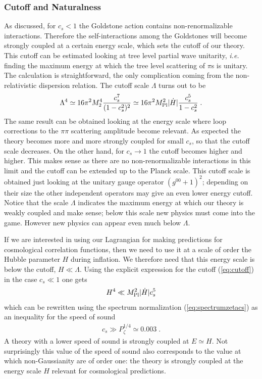 \documentclass[12pt,letterpaper]{article}
\def\be{\begin{eqnarray}}
\def\ee{\end{eqnarray}}
\begin{document}
{\subsubsection{Cutoff and Naturalness}
As discussed, for $c_s <1$ the Goldstone action contains
non-renormalizable interactions. Therefore the self-interactions among
the Goldstones will become strongly coupled at a certain energy scale, which
sets the cutoff of our theory. This cutoff can be estimated looking at
tree level partial wave unitarity, {\em i.e.} finding the maximum energy
at which the tree level scattering of $\pi$s is unitary. The
calculation is straightforward, the only complication coming from the
non-relativistic dispersion relation. The cutoff scale $\Lambda$
turns out to be
\be
\label{eq:cutoff}
\Lambda^4 \simeq 16 \pi^2 M_2^4 \frac{c_s^7}{(1-c_s^2)^2} \simeq 16
\pi^2 M_{\rm Pl}^2 |\dot H|
\frac{c_s^5}{1-c_s^2} \;.
\ee
The same result can be obtained looking at the energy scale where loop
corrections to the $\pi \pi$ scattering amplitude become relevant.
As expected the theory becomes more and more strongly coupled for
small $c_s$, so that the cutoff scale decreases. On the other hand, for
$c_s \to 1$ the cutoff becomes higher and higher. This makes sense as
there are no non-renormalizable interactions in this limit and the
cutoff can be extended up to the Planck scale. This cutoff scale is
obtained just looking at the unitary gauge operator $(g^{00}+1)^2$;
depending on their size the other independent operators may give an
even lower energy cutoff. Notice that the scale $\Lambda$ indicates the maximum energy at which
our theory is weakly coupled and make sense; below this scale new
physics must
come into the game. However new physics can appear even much below
$\Lambda$. 

If we are interested in using our Lagrangian for making predictions for
cosmological correlation functions, then we need to use it at a
scale of order the Hubble parameter $H$ during inflation. We therefore
need that this energy scale is below the cutoff, $H \ll
\Lambda$. Using the explicit expression for the cutoff (\ref{eq:cutoff}) in the case $c_s
\ll 1$ one gets
\be
H^4 \ll M_{\rm Pl}^2 |\dot H| c_s^5
\ee 
which can be rewritten using the spectrum normalization
(\ref{eq:spectrumzetacs}) as an inequality for the speed of sound
\be
c_s \gg P_\zeta^{1/4} \simeq 0.003 \;. 
\ee
A theory with a lower speed of sound is strongly coupled at $E \simeq H$. Not surprisingly this value of the speed of sound also corresponds to the value at which non-Gaussianity are of order one: the theory is strongly coupled at the energy scale $H$ relevant for cosmological predictions.

}
\end{document}
